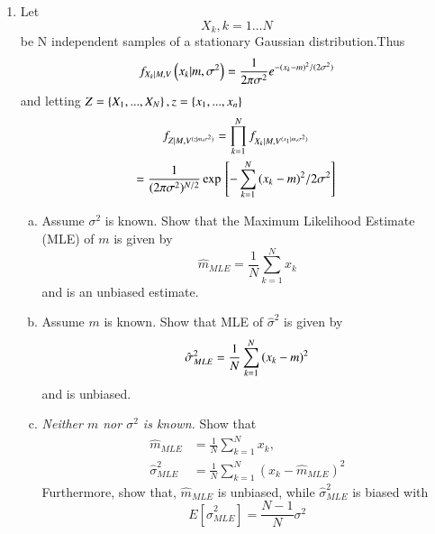 \documentclass[journal,12pt,twocolumn]{IEEEtran}
\begin{document}
\begin{enumerate}[1.]
\begin{enumerate}[(a)]
\end{enumerate}
\item 
%
Let
\begin{equation*}
{X_k}, {k=1} \dots N
\end{equation*}
%
be N independent samples of a stationary Gaussian distribution.Thus
\begin{equation}
f_{{X_k}|{M},{V}}\left(x_k|m,{\sigma^2}\right)=\frac{1}{2\pi\sigma^2}e^{-(x_k-m)^2/(2\sigma^2)}
\end{equation}
%
and letting $Z=\left\{{X_1},...,{X_N}\right\},z=\left\{x_1,...,x_n\right\}$
\begin{multline}
f_{{Z|M},{V^{{(z|m,\sigma^2})}}}=\prod_{k=1}^{N}f_{{X_k}|{M},{V^{{(x_1}|m,{\sigma^2})}}}
\\
=\frac{1}{(2\pi\sigma^2)^{N/2}}\exp{}\left[-\sum_{k=1}^{N}{({x_k}-m)^2}/{2\sigma^2}\right]
\end{multline}
\begin{enumerate}[(a)]
\item Assume $\sigma^2$ is known. Show that the Maximum Likelihood Estimate (MLE) of $m$ is given by
\begin{equation}
\hat{m}_{MLE}=\frac{1}{N}\sum_{k=1}^{N}x_{k}
\end{equation}
%
and is an unbiased estimate.
\item Assume $m$ is known. Show that MLE of  $\hat{\sigma}^2	$ is given by
\begin{equation}
\hat{\sigma}^2_{MLE}=\frac{1}{N}\sum_{k=1}^{N}\left({x_k}-m\right)^2
\end{equation}
and is unbiased.
\item \textit{Neither $m$ nor $\sigma^2$ is known.} Show that
\begin{align}
\hat{m}_{MLE}&=\frac{1}{N}\sum_{k=1}^{N}x_{k},  
\\
\hat{\sigma}^2_{MLE}
&=\frac{1}{N}\sum_{k=1}^{N}({x_k}-\hat{m}_{MLE})^2
\end{align}
%
Furthermore, show that, $\hat{m}_{MLE}$ is unbiased, while $\hat{\sigma}^2_{MLE}$ is biased with
\begin{equation}
E[\hat{\sigma}^2_{MLE}]=\frac{N-1}{N}\sigma^2
\end{equation}


\end{enumerate}
\end{enumerate}
\end{document}
